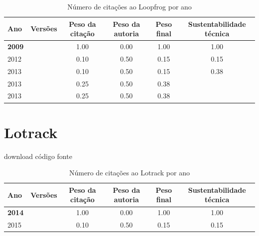 \begin{table}[H]
\caption{Número de citações ao Loopfrog por ano}
\centering
\begin{tabular}{| l | c | c | c | c | c |}
  \hline
  Ano & Versões & Peso da citação & Peso da autoria & Peso final & Sustentabilidade técnica \\
  \hline
            {\bf 2009}
          &
          
          &
          1.00
          &
          0.00
          &
          1.00
          &
            {\color{blue} 1.00}
          \\
\hline
            2012
          &
          
          &
          0.10
          &
          0.50
          &
          0.15
          &
            {\color{red} 0.15}
          \\
\hline
            2013
          &
          
          &
          0.10
          &
          0.50
          &
          0.15
          &
            {\color{red} 0.38}
          \\
            2013
          &
          
          &
          0.25
          &
          0.50
          &
          0.38
          &
          \\
            2013
          &
          
          &
          0.25
          &
          0.50
          &
          0.38
          &
          \\
\hline
\end{tabular}
\end{table}



\section{Lotrack}
\checkmark download
\checkmark código fonte


\begin{table}[H]
\caption{Número de citações ao Lotrack por ano}
\centering
\begin{tabular}{| l | c | c | c | c | c |}
  \hline
  Ano & Versões & Peso da citação & Peso da autoria & Peso final & Sustentabilidade técnica \\
  \hline
            {\bf 2014}
          &
          
          &
          1.00
          &
          0.00
          &
          1.00
          &
            {\color{blue} 1.00}
          \\
\hline
            2015
          &
          
          &
          0.10
          &
          0.50
          &
          0.15
          &
            {\color{red} 0.15}
          \\
\hline
\end{tabular}
\end{table}



